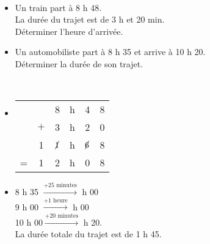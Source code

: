 \begin{exemple}[0.5]
    \ \\ [-10mm]
    \begin{itemize}
        \item Un train part à 8 h 48.\\ La durée du trajet est de 3 h et 20 min. \\
        Déterminer l'heure d'arrivée.
        \item Un automobiliste part à 8 h 35 et arrive à 10 h 20. \\
        Déterminer la durée de son trajet.
    \end{itemize}
    \correction
    \ \\ [-10mm]
    \begin{itemize}
        \item   
        \begin{tabular}{>{\centering\arraybackslash}p{0.5cm}ccccc}
            & & 8 & h & 4 & 8 \\
            & $+$ & 3 & h & 2 & 0 \\
            \hline
            & 1 & $\cancel{1}$ & h & $\cancel{6}$ & 8 \\
            = & 1 & 2 & h & 0 & 8 \\
        \end{tabular}
        \item 8 h 35 \quad $\xrightarrow{+\text{25 minutes}}$  h 00 \\
        9 h 00 \quad $\xrightarrow{+\text{1 heure}}$  h 00 \\
        10 h 00\quad $\xrightarrow{+\text{20 minutes}}$  h 20. \\   
        La durée totale du trajet est de 1 h 45.
    \end{itemize}   
\end{exemple}